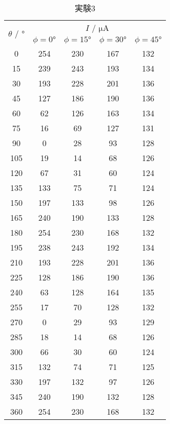 \begin{table}[h]
   \caption{実験3}
   \label{tab:app_res3}
   \centering
   \begin{tabular}{ccccc}
     \hline
     \multirow{2}{*}{$\theta$ / $\si{\degree}$}&\multicolumn{4}{c}{$I$ / $\si{\micro\ampere}$}\\ \cline{2-5}
     &$\phi=0\si{\degree}$&$\phi=15\si{\degree}$&$\phi=30\si{\degree}$&$\phi=45\si{\degree}$\\
     \hline \hline
     0 & 254 & 230 & 167 & 132 \\
15 & 239 & 243 & 193 & 134 \\
30 & 193 & 228 & 201 & 136 \\
45 & 127 & 186 & 190 & 136 \\
60 & 62 & 126 & 163 & 134 \\
75 & 16 & 69 & 127 & 131 \\
90 & 0 & 28 & 93 & 128 \\
105 & 19 & 14 & 68 & 126 \\
120 & 67 & 31 & 60 & 124 \\
135 & 133 & 75 & 71 & 124 \\
150 & 197 & 133 & 98 & 126 \\
165 & 240 & 190 & 133 & 128 \\
180 & 254 & 230 & 168 & 132 \\
195 & 238 & 243 & 192 & 134 \\
210 & 193 & 228 & 201 & 136 \\
225 & 128 & 186 & 190 & 136 \\
240 & 63 & 128 & 164 & 135 \\
255 & 17 & 70 & 128 & 132 \\
270 & 0 & 29 & 93 & 129 \\
285 & 18 & 14 & 68 & 126 \\
300 & 66 & 30 & 60 & 124 \\
315 & 132 & 74 & 71 & 125 \\
330 & 197 & 132 & 97 & 126 \\
345 & 240 & 190 & 132 & 128 \\
360 & 254 & 230 & 168 & 132 \\
     \hline
   \end{tabular}
\end{table}